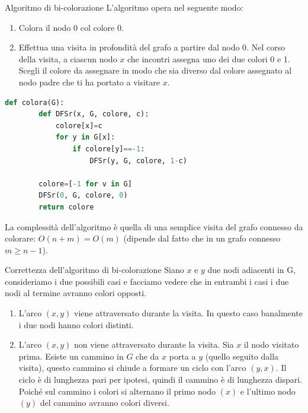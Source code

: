 \begin{Algoritmo}{Algoritmo di bi-colorazione}{}
    L'algoritmo opera nel seguente modo:
    \begin{enumerate}
            \item Colora il nodo 0 col colore 0.
            \item Effettua una visita in profondità del grafo a partire dal nodo 0. Nel corso della visita, a ciascun nodo $x$ che incontri assegna uno dei due colori 0 e 1. Scegli il colore da assegnare in modo che sia diverso dal colore assegnato al nodo padre che ti ha portato a visitare $x$.
        \end{enumerate}
        \begin{lstlisting}[language=Python]
    def colora(G):
        def DFSr(x, G, colore, c):
            colore[x]=c
            for y in G[x]:
                if colore[y]==-1:
                    DFSr(y, G, colore, 1-c)
        
        colore=[-1 for v in G]
        DFSr(0, G, colore, 0)
        return colore
        \end{lstlisting}

        La complessità dell'algoritmo è quella di una semplice visita del grafo connesso da colorare: $O(n+m)=O(m)$ (dipende dal fatto che in un grafo connesso $m\geq n-1$).
\end{Algoritmo}

\begin{Thm}{Correttezza dell'algoritmo di bi-colorazione}{}
    Siano $x$ e $y$ due nodi adiacenti in G, consideriamo i due possibili casi e facciamo vedere che in entrambi i casi i due nodi al termine avranno colori opposti.

    \begin{demonstration}\phantom{}
    \begin{enumerate}
        \item L'arco $(x, y)$ viene attraversato durante la visita. In questo caso banalmente i due nodi hanno colori distinti.
        \item L'arco $(x, y)$ non viene attraversato durante la visita. Sia $x$ il nodo visitato prima. Esiste un cammino in $G$ che da $x$ porta a $y$ (quello seguito dalla visita), questo cammino si chiude a formare un ciclo con l'arco $(y, x)$. Il ciclo è di lunghezza pari per ipotesi, quindi il cammino è di lunghezza dispari. Poiché sul cammino i colori si alternano il primo nodo $(x)$ e l'ultimo nodo $(y)$ del cammino avranno colori diversi. 
    \end{enumerate}    
    \end{demonstration}
    
\end{Thm}

